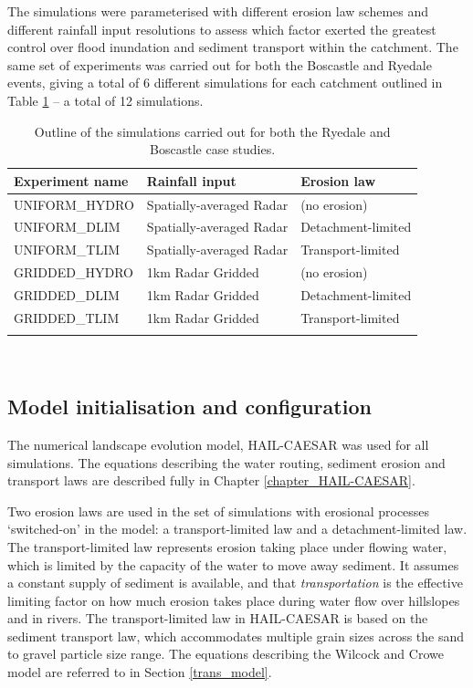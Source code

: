 The simulations were parameterised with different erosion law schemes and different rainfall input resolutions to assess which factor exerted the greatest control over flood inundation and sediment transport within the catchment. The same set of experiments was carried out for both the Boscastle and Ryedale events, giving a total of 6 different simulations for each catchment outlined in Table \ref{table_ensemble_experiments} -- a total of 12 simulations.


\begin{table}
\begin{tabular}{lll}
\\
\textbf{Experiment name}   & \textbf{Rainfall input} & \textbf{Erosion law}  \\
\hline
UNIFORM\_HYDRO  &  Spatially-averaged  Radar  & (no erosion) \\
UNIFORM\_DLIM      &  Spatially-averaged  Radar & Detachment-limited \\
UNIFORM\_TLIM       &  Spatially-averaged  Radar & Transport-limited \\

GRIDDED\_HYDRO  &  1km Radar Gridded  & (no erosion) \\
GRIDDED\_DLIM      &  1km Radar Gridded  & Detachment-limited \\
GRIDDED\_TLIM       &  1km Radar Gridded   & Transport-limited \\
\hline \\ 
\end{tabular} 
\caption{Outline of the simulations carried out for both the Ryedale and Boscastle case studies.}
\label{table_ensemble_experiments}
\end{table}

\

\subsection{Model initialisation and configuration}
The numerical landscape evolution model, HAIL-CAESAR was used for all simulations. The equations describing the water routing, sediment erosion and transport laws are described fully in Chapter \ref{chapter_HAIL-CAESAR}.

Two erosion laws are used in the set of simulations with erosional processes `switched-on' in the model: a transport-limited law and a detachment-limited law. The transport-limited law represents erosion taking place under flowing water, which is limited by the capacity of the water to move away sediment. It assumes a constant supply of sediment is available, and that \textit{transportation} is the effective limiting factor on how much erosion takes place during water flow over hillslopes and in rivers. The transport-limited law in HAIL-CAESAR is based on the \citet{wilcock2003surface} sediment transport law, which accommodates multiple grain sizes across the sand to gravel particle size range. The equations describing the Wilcock and Crowe model are referred to in Section \ref{trans_model}.

